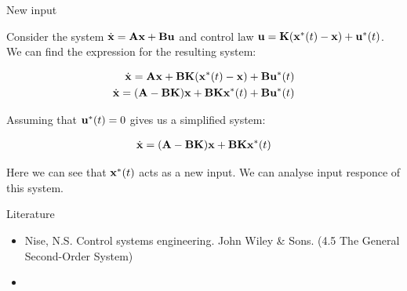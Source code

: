\documentclass{beamer}
\begin{document}
\begin{frame}{New input}
	\begin{flushleft}
		
		Consider the system $\dot{\mathbf{x}} = \mathbf{A}\mathbf{x} + \mathbf{B}\mathbf{u}$ and control law $\mathbf{u} = \mathbf{K}(\mathbf{x}^*(t) - \mathbf{x}) + \mathbf{u}^*(t)$. We can find the expression for the resulting system:
		
		\begin{align}
			\dot{\mathbf{x}} = \mathbf{A}\mathbf{x} + \mathbf{B}\mathbf{K}(\mathbf{x}^*(t) - \mathbf{x}) + \mathbf{B}\mathbf{u}^*(t) \\
			\dot{\mathbf{x}} = (\mathbf{A}- \mathbf{B}\mathbf{K})\mathbf{x} +\mathbf{B}\mathbf{K}\mathbf{x}^*(t) + \mathbf{B}\mathbf{u}^*(t)
		\end{align}		
		
		Assuming that $\mathbf{u}^*(t) = 0$ gives us a simplified system:
		
		\begin{align}
			\dot{\mathbf{x}} =  (\mathbf{A}- \mathbf{B}\mathbf{K})\mathbf{x} +\mathbf{B}\mathbf{K}\mathbf{x}^*(t)
		\end{align}				
		
		Here we can see that $\mathbf{x}^*(t)$ acts as a new input. We can analyse input responce of this system.
		
	\end{flushleft}
\end{frame}





\begin{frame}{Literature}

\begin{itemize}
	
	
	\item Nise, N.S. Control systems engineering. John Wiley \& Sons. (4.5 The General Second-Order System)	
	
	\item {}
\end{itemize}
\end{frame}




\myqrframe
\end{document}
